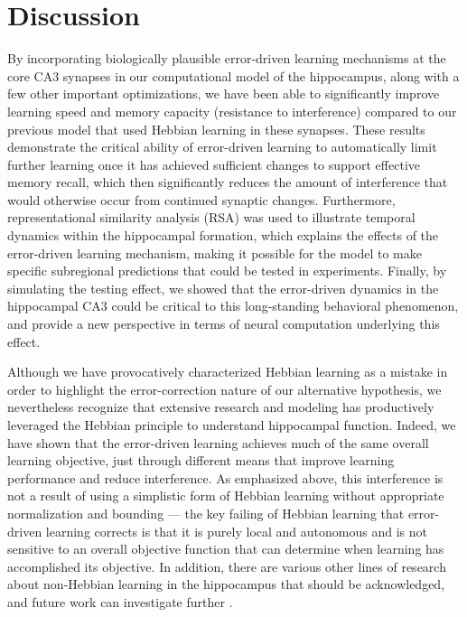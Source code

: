 \documentclass[10pt,letterpaper]{article}
\begin{document}
\section*{Discussion}

By incorporating biologically plausible error-driven learning mechanisms at the core CA3 synapses in our computational model of the hippocampus, along with a few other important optimizations, we have been able to significantly improve learning speed and memory capacity (resistance to interference) compared to our previous model that used Hebbian learning in these synapses. These results demonstrate the critical ability of error-driven learning to automatically limit further learning once it has achieved sufficient changes to support effective memory recall, which then significantly reduces the amount of interference that would otherwise occur from continued synaptic changes.  Furthermore, representational similarity analysis (RSA) was used to illustrate temporal dynamics within the hippocampal formation, which explains the effects of the error-driven learning mechanism, making it possible for the model to make specific subregional predictions that could be tested in experiments.  Finally, by simulating the testing effect, we showed that the error-driven dynamics in the hippocampal CA3 could be critical to this long-standing behavioral phenomenon, and provide a new perspective in terms of neural computation underlying this effect.

Although we have provocatively characterized Hebbian learning as a mistake in order to highlight the error-correction nature of our alternative hypothesis, we nevertheless recognize that extensive research and modeling has productively leveraged the Hebbian principle to understand hippocampal function.  Indeed, we have shown that the error-driven learning achieves much of the same overall learning objective, just through different means that improve learning performance and reduce interference.  As emphasized above, this interference is not a result of using a simplistic form of Hebbian learning without appropriate normalization and bounding --- the key failing of Hebbian learning that error-driven learning corrects is that it is purely local and autonomous and is not sensitive to an overall objective function that can determine when learning has accomplished its objective.  In addition, there are various other lines of research about non-Hebbian learning in the hippocampus that should be acknowledged, and future work can investigate further \cite{RebolaCartaMulle17,Jackson20,PandaRoy17,ChistiakovaBannonBazhenovEtAl14,TsukamotoYasuiYamadaEtAl03}.
\end{document}
